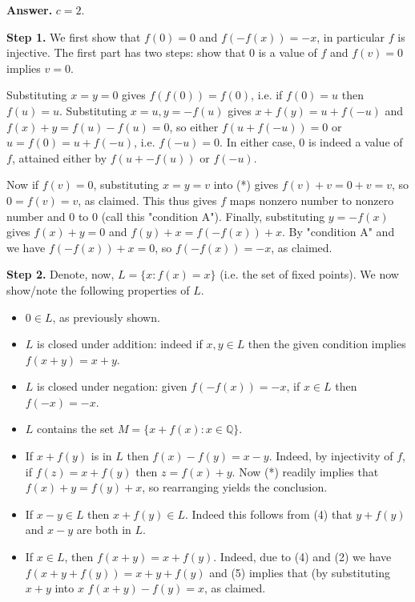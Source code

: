 \documentclass[11pt,a4paper]{article}
\begin{document}
\begin{enumerate}
		\textbf{Answer. } $c=2$. 
		
		\textbf{Step 1.} 
		We first show that $f(0)=0$ and $f(-f(x))=-x$, in particular $f$ is injective. The first part has two steps: show that $0$ is a value of $f$ and $f(v)=0$ implies $v=0$.
		
		Substituting $x=y=0$ gives $f(f(0))=f(0)$, i.e. if $f(0)=u$ then $f(u)=u$. Substituting $x=u, y=-f(u)$ 
		gives $x + f(y) = u+f(-u)$ and $f(x) + y = f(u) - f(u) = 0$, so either $f(u + f(-u)) = 0$ or $u = f(0) = u + f(-u)$, i.e. $f(-u) = 0$. In either case, 0 is indeed a value of $f$, attained either by $f(u + -f(u))$ or $f(-u)$.
		
		Now if $f(v)=0$, substituting $x=y=v$ into (*) gives $f(v)+v=0+v=v$, so $0=f(v)=v$, as claimed. This thus gives $f$ maps nonzero number to nonzero number and 0 to 0 (call this "condition A"). Finally, substituting $y = -f(x)$ gives $f(x)+y = 0$ and $f(y)+x = f(-f(x))+x$. By "condition A" and we have $f(-f(x))+x=0$, so $f(-f(x))=-x$, as claimed.
		
		\textbf{Step 2.} 
		Denote, now, $L = \{x: f(x)=x\}$ (i.e. the set of fixed points). We now show/note the following properties of $L$. 
		
		\begin{itemize}
			\item $0\in L$, as previously shown. 
			
			\item $L$ is closed under addition: indeed if $x, y\in L$ then the given condition implies $f(x+y)=x+y$.
			
			\item $L$ is closed under negation: given $f(-f(x))=-x$, if $x\in L$ then $f(-x)=-x$.
			
			\item $L$ contains the set $M = \{x + f(x): x\in\mathbb{Q}\}$.
			
			\item If $x + f(y)$ is in $L$ then $f(x) - f(y) = x - y$. Indeed, by injectivity of $f$, if $f(z) = x + f(y)$ then $z = f(x) + y$. Now (*) readily implies that $f(x) + y = f(y) + x$, so rearranging yields the conclusion.
			
			\item If $x - y\in L$ then $x + f(y)\in L$. Indeed this follows from (4) that $y + f(y)$ and $x - y$ are both in $L$.
			
			\item If $x\in L$, then $f(x + y) = x + f(y)$. Indeed, due to (4) and (2) we have $f(x + y + f(y)) = x + y + f(y)$ and (5) implies that (by substituting $x + y$ into $x$ $f(x + y) - f(y) = x$, as claimed.
		\end{itemize}
		

\end{enumerate}
\end{document}
